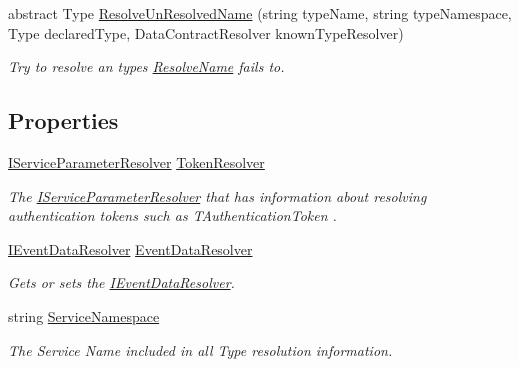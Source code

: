 \begin{DoxyCompactItemize}
abstract Type \hyperlink{classCqrs_1_1Services_1_1BasicServiceParameterResolver_a2815cb9d0647e0b019d3f148a0c8e9cc_a2815cb9d0647e0b019d3f148a0c8e9cc}{Resolve\+Un\+Resolved\+Name} (string type\+Name, string type\+Namespace, Type declared\+Type, Data\+Contract\+Resolver known\+Type\+Resolver)
\begin{DoxyCompactList}\small\item\em Try to resolve an types \hyperlink{classCqrs_1_1Services_1_1BasicServiceParameterResolver_a8c598f2f49a83190c315afc88e5630d5_a8c598f2f49a83190c315afc88e5630d5}{Resolve\+Name} fails to. \end{DoxyCompactList}\end{DoxyCompactItemize}
\subsection*{Properties}
\begin{DoxyCompactItemize}
\item 
\hyperlink{interfaceCqrs_1_1Services_1_1IServiceParameterResolver}{I\+Service\+Parameter\+Resolver} \hyperlink{classCqrs_1_1Services_1_1BasicServiceParameterResolver_a0ed208048d0f925dfa1e14fb73d82f0b_a0ed208048d0f925dfa1e14fb73d82f0b}{Token\+Resolver}
\begin{DoxyCompactList}\small\item\em The \hyperlink{interfaceCqrs_1_1Services_1_1IServiceParameterResolver}{I\+Service\+Parameter\+Resolver} that has information about resolving authentication tokens such as {\itshape T\+Authentication\+Token} . \end{DoxyCompactList}\item 
\hyperlink{interfaceCqrs_1_1Services_1_1IEventDataResolver}{I\+Event\+Data\+Resolver} \hyperlink{classCqrs_1_1Services_1_1BasicServiceParameterResolver_a49d548e272010a9047bac9671e5b1f70_a49d548e272010a9047bac9671e5b1f70}{Event\+Data\+Resolver}
\begin{DoxyCompactList}\small\item\em Gets or sets the \hyperlink{interfaceCqrs_1_1Services_1_1IEventDataResolver}{I\+Event\+Data\+Resolver}. \end{DoxyCompactList}\item 
string \hyperlink{classCqrs_1_1Services_1_1BasicServiceParameterResolver_a78d53a2ee367086bca9f2d2118746836_a78d53a2ee367086bca9f2d2118746836}{Service\+Namespace}
\begin{DoxyCompactList}\small\item\em The Service Name included in all Type resolution information. \end{DoxyCompactList}\end{DoxyCompactItemize}



